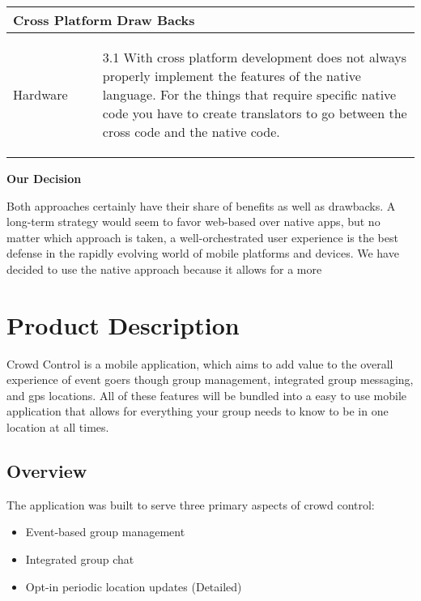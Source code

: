 \begin{center}
\begin{tabularx}{\textwidth}[t]{XX}
\hline
\multicolumn{2}{l}{%
\textbf{\textcolor{myGreen}{Cross Platform Draw Backs}}} \\
\hline

Hardware &
\begin{minipage}[t]{\linewidth}%
\begin{itemize}
\item[3.1] With cross platform development does not always properly implement the features of the native language. For the things that require specific native code you have to create translators to go between the cross code and the native code.
\end{itemize} 
\end{minipage}\\


\end{tabularx}
\end{center}


\textbf{Our Decision}

Both approaches certainly have their share of benefits as well as drawbacks. A long-term strategy would seem to favor web-based over native apps, but no matter which approach is taken, a well-orchestrated user experience is the best defense in the rapidly evolving world of mobile platforms and devices. We have decided to use the native approach because it allows for a more 

\section{Product Description}

Crowd Control is a mobile application, which aims to add value to the overall experience of event goers though group management, integrated group messaging, and gps locations. All of these features will be bundled into a easy to use mobile application that allows for everything your group needs to know to be in one location at all times.

\subsection{Overview}

The application was built to serve three primary aspects of crowd control: 
\begin{itemize}
\item Event-based group management
\item Integrated group chat
\item Opt-in periodic location updates
         (Detailed)
\end{itemize}

